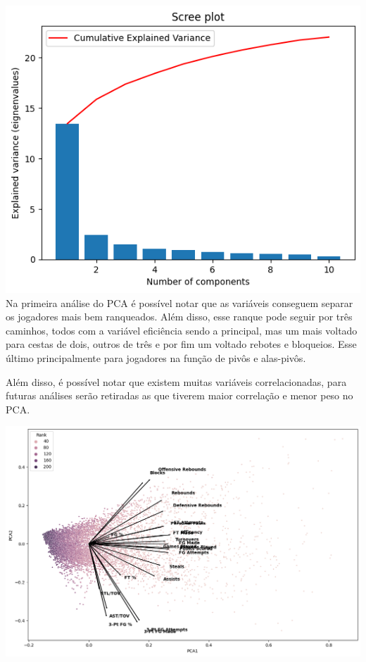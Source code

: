 \documentclass[
]{book}
\begin{document}
\includegraphics{imagens/3.png} Na primeira análise do PCA é possível notar que as variáveis conseguem separar os jogadores mais bem ranqueados. Além disso, esse ranque pode seguir por três caminhos, todos com a variável eficiência sendo a principal, mas um mais voltado para cestas de dois, outros de três e por fim um voltado rebotes e bloqueios. Esse último principalmente para jogadores na função de pivôs e alas-pivôs.

Além disso, é possível notar que existem muitas variáveis correlacionadas, para futuras análises serão retiradas as que tiverem maior correlação e menor peso no PCA.

\includegraphics{imagens/4.png}
\end{document}
